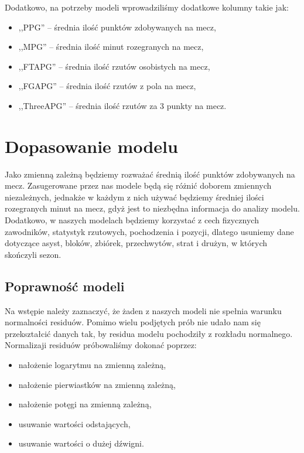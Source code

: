 \documentclass[11pt,a4paper]{article}
\begin{document}
	Dodatkowo, na potrzeby modeli wprowadziliśmy dodatkowe kolumny takie jak:
\begin{itemize}	
	\item ,,PPG'' -- średnia ilość punktów zdobywanych na mecz,
	\item ,,MPG'' -- średnia ilość minut rozegranych na mecz,
	\item ,,FTAPG'' -- średnia ilość rzutów osobistych na mecz,
	\item ,,FGAPG'' -- średnia ilość rzutów z pola na mecz,
	\item ,,ThreeAPG'' -- średnia ilość rzutów za 3 punkty na mecz.
\end{itemize}
	
\section{Dopasowanie modelu}
Jako zmienną zależną będziemy rozważać średnią ilość punktów zdobywanych na mecz. Zasugerowane przez nas modele będą się różnić doborem zmiennych niezależnych, jednakże w każdym z nich używać będziemy średniej ilości rozegranych minut na mecz, gdyż jest to niezbędna informacja do analizy modelu. Dodatkowo, w naszych modelach będziemy korzystać z cech fizycznych zawodników, statystyk rzutowych, pochodzenia i pozycji, dlatego usuniemy dane dotyczące asyst, bloków, zbiórek, przechwytów, strat i drużyn, w których skończyli sezon.

\subsection{Poprawność modeli}
Na wstępie należy zaznaczyć, że żaden z naszych modeli nie spełnia warunku normalności residuów. Pomimo wielu podjętych prób nie udało nam się przekształcić danych tak, by residua modelu pochodziły z rozkładu normalnego. Normalizaji residuów próbowaliśmy dokonać poprzez:
\begin{itemize}
	\item nałożenie logarytmu na zmienną zależną,
	\item nałożenie pierwiastków na zmienną zależną,
	\item nałożenie potęgi na zmienną zależną,
	\item usuwanie wartości odstających,
	\item usuwanie wartości o dużej dźwigni.
\end{itemize}
\end{document}
